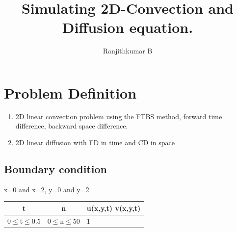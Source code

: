 \documentclass[conf]{new-aiaa}
\title{Simulating 2D-Convection and Diffusion equation.\\}
\author{Ranjithkumar B}
\affil{SC22M008, M.Tech. Aerospace - Aerodynamics and Flight Mechanics}
\begin{document}
\maketitle

%


\section{Problem Definition}
\begin{enumerate}
	\item 2D linear convection problem using the FTBS method, forward time difference, backward space difference.
	\item 2D linear diffusion with FD in time and CD in space
\end{enumerate}
\subsection{Boundary condition}
\par x=0 and x=2, y=0 and y=2\\
\begin{center}
	\begin{tabular}{c | c | m{2em}}
		t & n & u(x,y,t) v(x,y,t) \\
		\hline
		0$\leq$t$\leq$0.5 & 0$\leq$n$\leq$50 & 1\\
	\end{tabular}
\end{center}
\end{document}
